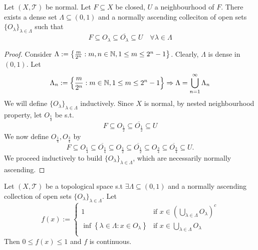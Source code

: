 \begin{lem}
    Let $(X, \mathcal{T})$ be normal. Let $F \subseteq X$ be closed, $U$ a neighbourhood of $F$.
    There exists a dense set $\Lambda \subseteq (0, 1)$ and a normally ascending colleciton of open sets
    $\{O_\lambda\}_{\lambda \in \Lambda}$ such that
    \[
        F \subseteq O_\lambda \subseteq \overline{O_\lambda} \subseteq U \quad \forall \lambda \in \Lambda
    \]       
\end{lem}
\begin{proof}
    Consider $\Lambda := \left\{ \frac{m}{2^n} : m, n \in \mathbb{N}, 1 \leq m \leq 2^n - 1 \right\} $.
    Clearly, $\Lambda$ is dense in $(0, 1)$.
    Let
    \[
        \Lambda_n := \left\{ \frac{m}{2^n} : m \in \mathbb{N}, 1 \leq m \leq 2^n - 1 \right\} 
        \Rightarrow \Lambda = \bigcup_{n=1}^\infty \Lambda_n
    \]   
    We will define $\{O_\lambda\}_{\lambda \in \Lambda}$ inductively. Since $X$ is normal,
    by nested neighbourhood property, let $O_{\frac{1}{2}}$ be s.t.
    \[
        F \subseteq O_\frac{1}{2} \subseteq \overline{O_\frac{1}{2}} \subseteq U
    \]    
    We now define $O_\frac{1}{4}, O_\frac{3}{4}$ by 
    \[
        F \subseteq O_\frac{1}{4} \subseteq \overline{O_\frac{1}{4}} \subseteq O_\frac{1}{2}
        \subseteq \overline{O_\frac{1}{2} } \subseteq O_\frac{3}{4} \subseteq \overline{O_\frac{3}{4}}
        \subseteq U.
    \]  
    We proceed inductively to build $\{O_\lambda\}_{\lambda \in \Lambda}$, which are necessarily
    normally ascending.
\end{proof}

\begin{lem}
    Let $(X, \mathcal{T})$ be a topological space s.t $\exists \Lambda \subseteq (0, 1)$ and a 
    normally ascending collection of open sets $\{O_\lambda\}_{\lambda \in \Lambda}$.  
    Let \[
        f(x) := \begin{cases}
            1 &\text{if } x \in (\bigcup_{\lambda \in \Lambda}O_\lambda)^c \\
            \inf \left\{ \lambda \in \Lambda : x \in O_\lambda \right\} & \text{if } x \in 
            \bigcup_{\lambda \in \Lambda} O_\lambda \\
        \end{cases}
    \] 
    Then $0 \leq f(x) \leq 1$ and $f$ is continuous.  
\end{lem}

